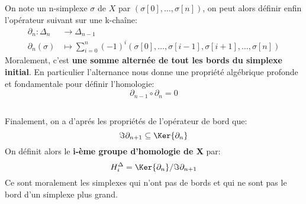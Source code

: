 \documentclass{report}
\begin{document}
\subsection*{}
On note un n-simplexe \(\sigma\) de \(X\) par \((\sigma[0], \ldots, \sigma[n])\), on peut alors définir enfin l'opérateur suivant sur une k-chaîne:
\[
   \begin{aligned}
      \partial_n : \Delta_n &\longrightarrow \Delta_{n-1} \\
      \partial_n(\sigma) &\longmapsto \sum_{i = 0}^{n} (-1)^i(\sigma[0], \ldots, \sigma[i-1], \sigma[i+1], \ldots, \sigma[n])
   \end{aligned}
\]
Moralement, c'est \textbf{une somme alternée de tout les bords du simplexe initial}. En particulier l'alternance nous donne une propriété algébrique profonde et fondamentale pour définir l'homologie:
\[
   \partial_{n-1} \circ \partial_{n} = 0
\]
\subsection*{}
Finalement, on a d'aprés les propriétés de l'opérateur de bord que:
\[
   \Im{\partial_{n+1}} \subseteq \Ker{\partial_{n}}
\]
On définit alors le \textbf{i-ème groupe d'homologie de X} par:
\[
   H^\Delta_i = \Ker{\partial_{n}} / \Im{\partial_{n+1}}
\]
Ce sont moralement les simplexes qui n'ont pas de bords et qui ne sont pas le bord d'un simplexe plus grand.
\end{document}
